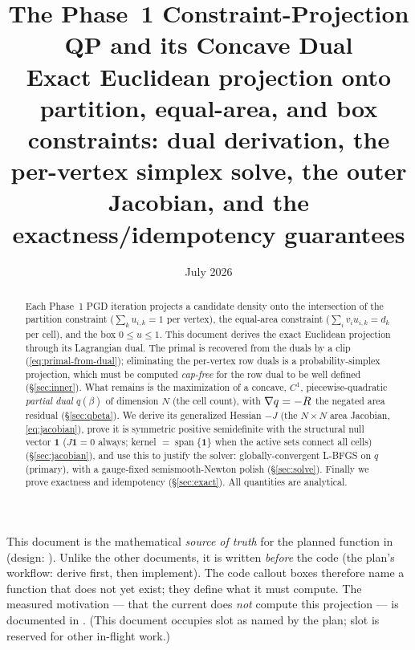 \documentclass[11pt,a4paper]{article}
\title{\textbf{The Phase~1 Constraint-Projection QP and its Concave Dual}\\[0.5em]
  \large Exact Euclidean projection onto partition, equal-area, and box
  constraints: dual derivation, the per-vertex simplex solve, the outer
  Jacobian, and the exactness/idempotency guarantees}
\author{}
\date{July 2026}
\begin{document}
\maketitle

\begin{tcolorbox}[colback=orange!8!white, colframe=orange!65!black,
                  title={Status --- specification (pre-implementation)}, fontupper=\small]
This document is the mathematical \emph{source of truth} for the planned function
 in 
(design: ). Unlike the
other  documents, it is written \emph{before} the code (the plan's
workflow: derive first, then implement). The code callout boxes therefore name a
function that does not yet exist; they define what it must compute. The measured
motivation --- that the current  does \emph{not}
compute this projection --- is documented in
. (This document occupies slot
 as named by the plan; slot  is reserved for other in-flight work.)
\end{tcolorbox}

\begin{abstract}
Each Phase~1 PGD iteration projects a candidate density onto the intersection of the
partition constraint ($\sum_k u_{i,k}=1$ per vertex), the equal-area constraint
($\sum_i v_i u_{i,k}=d_k$ per cell), and the box $0\le u\le1$. This document derives the
exact Euclidean projection through its Lagrangian dual. The primal is recovered from the
duals by a clip (\eqref{eq:primal-from-dual}); eliminating the per-vertex row duals is a
probability-simplex projection, which must be computed \emph{cap-free} for the row dual to
be well defined (\S\ref{sec:inner}). What remains is the maximization of a concave,
$C^1$, piecewise-quadratic \emph{partial dual} $q(\beta)$ of dimension $N$ (the cell
count), with $\nabla q=-R$ the negated area residual (\S\ref{sec:qbeta}). We derive its
generalized Hessian $-J$ (the $N\times N$ area Jacobian, \eqref{eq:jacobian}), prove it is
symmetric positive semidefinite with the structural null vector $\mathbf 1$ ($J\mathbf 1=0$
always; kernel $=\operatorname{span}\{\mathbf 1\}$ when the active sets connect all cells)
(\S\ref{sec:jacobian}), and use this to justify the solver: globally-convergent L-BFGS on
$q$ (primary), with a gauge-fixed semismooth-Newton polish (\S\ref{sec:solve}). Finally we
prove exactness and idempotency (\S\ref{sec:exact}). All quantities are analytical.
\end{abstract}
\end{document}
